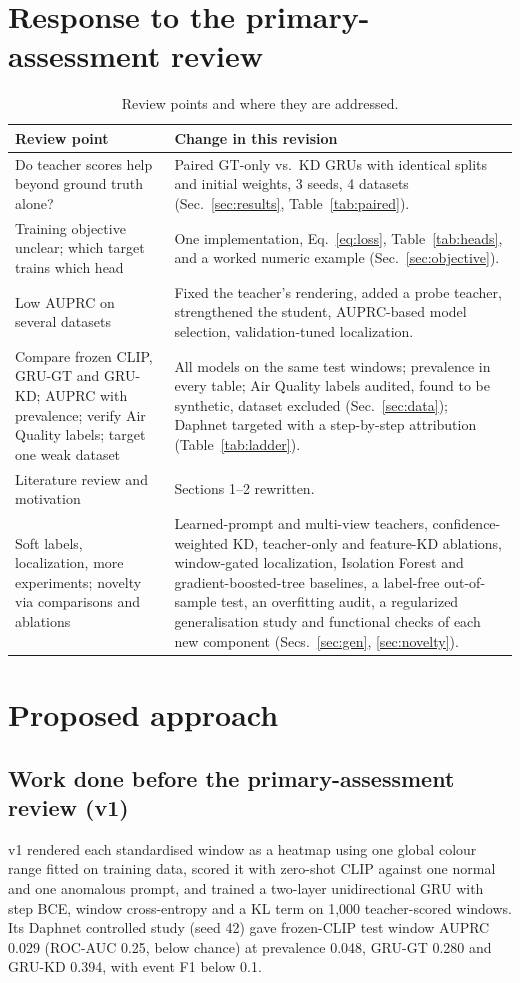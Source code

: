 \documentclass[twoside,english]{article}
\begin{document}
\section{Response to the primary-assessment review} \label{sec:review}
\begin{table}[h]
\centering\small
\caption{Review points and where they are addressed.}
\label{tab:review}
\begin{tabular}{p{2.3in}p{3.9in}}
\toprule
Review point & Change in this revision \\
\midrule
Do teacher scores help beyond ground truth alone? & Paired GT-only vs.\ KD GRUs with identical splits and initial weights, 3 seeds, 4 datasets (Sec.~\ref{sec:results}, Table~\ref{tab:paired}). \\
Training objective unclear; which target trains which head & One implementation, Eq.~\eqref{eq:loss}, Table~\ref{tab:heads}, and a worked numeric example (Sec.~\ref{sec:objective}). \\
Low AUPRC on several datasets & Fixed the teacher's rendering, added a probe teacher, strengthened the student, AUPRC-based model selection, validation-tuned localization. \\
Compare frozen CLIP, GRU-GT and GRU-KD; AUPRC with prevalence; verify Air Quality labels; target one weak dataset & All models on the same test windows; prevalence in every table; Air Quality labels audited, found to be synthetic, dataset excluded (Sec.~\ref{sec:data}); Daphnet targeted with a step-by-step attribution (Table~\ref{tab:ladder}). \\
Literature review and motivation & Sections 1--2 rewritten. \\
Soft labels, localization, more experiments; novelty via comparisons and ablations & Learned-prompt and multi-view teachers, confidence-weighted KD, teacher-only and feature-KD ablations, window-gated localization, Isolation Forest and gradient-boosted-tree baselines, a label-free out-of-sample test, an overfitting audit, a regularized generalisation study and functional checks of each new component (Secs.~\ref{sec:gen}, \ref{sec:novelty}). \\
\bottomrule
\end{tabular}
\end{table}

\section{Proposed approach} \label{sec:our_proj}
\subsection{Work done before the primary-assessment review (v1)}
v1 rendered each standardised window as a heatmap using one global colour range fitted on training data, scored it with zero-shot CLIP against one normal and one anomalous prompt, and trained a two-layer unidirectional GRU with step BCE, window cross-entropy and a KL term on 1{,}000 teacher-scored windows. Its Daphnet controlled study (seed 42) gave frozen-CLIP test window AUPRC 0.029 (ROC-AUC 0.25, below chance) at prevalence 0.048, GRU-GT 0.280 and GRU-KD 0.394, with event F1 below 0.1.
\end{document}
